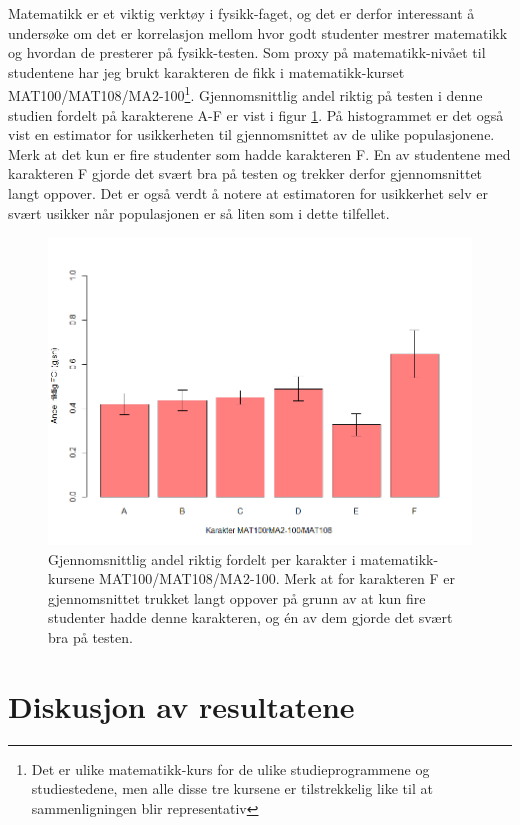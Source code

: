 \documentclass[a4paper,norsk,12pt]{report}
\begin{document}
Matematikk er et viktig verktøy i fysikk-faget, og det er derfor interessant å undersøke om det er korrelasjon mellom hvor godt studenter mestrer matematikk og hvordan de presterer på fysikk-testen. Som proxy på matematikk-nivået til studentene har jeg brukt karakteren de fikk i matematikk-kurset MAT100/MAT108/MA2-100\footnote{Det er ulike matematikk-kurs for de ulike studieprogrammene og studiestedene, men alle disse tre kursene er tilstrekkelig like til at sammenligningen blir representativ}. Gjennomsnittlig andel riktig på testen i denne studien fordelt på karakterene A-F er vist i figur \ref{fig:mat100}. På histogrammet er det også vist en estimator for usikkerheten til gjennomsnittet av de ulike populasjonene. Merk at det kun er fire studenter som hadde karakteren F. En av studentene med karakteren F gjorde det svært bra på testen og trekker derfor gjennomsnittet langt oppover. Det er også verdt å notere at estimatoren for usikkerhet selv er svært usikker når populasjonen er så liten som i dette tilfellet.
\begin{figure}[p]
\begin{center}
	\includegraphics[width=.48\textwidth]{./mat100}
\end{center}
	\caption{Gjennomsnittlig andel riktig fordelt per karakter i matematikk-kursene MAT100/MAT108/MA2-100. Merk at for karakteren F er gjennomsnittet trukket langt oppover på grunn av at kun fire studenter hadde denne karakteren, og \'en av dem gjorde det svært bra på testen.}
	\label{fig:mat100}
\end{figure}



\chapter{Diskusjon av resultatene}
\end{document}
